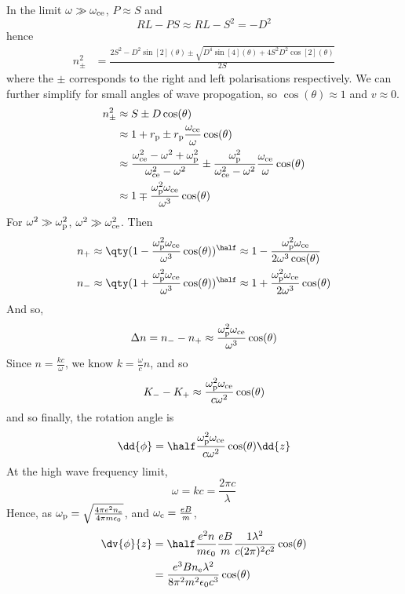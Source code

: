 \documentclass{book}         		                %
\begin{document}
In the limit $\omega \gg \omega_{\rm ce}$, $P \approx S$ and 
\[ RL - PS \approx  RL -S^2 = -D^2 \]
hence
\begin{align*}
  n_{\pm}^2 &= \frac{2 S^2 - D^2 \sin[2](\theta) \pm \sqrt{D^4 \sin[4](\theta) + 4 S^2 D^2 \cos[2](\theta)}}{2S}
\end{align*}
where the $\pm$ corresponds to the right and left polarisations
respectively. We can further simplify for small angles of wave
propogation, so $\cos(\theta)\approx 1$ and $v \approx 0$.
\begin{align*} n_{\pm}^2 &\approx S \pm D \cos(\theta) \\
& \approx 1 + r_{\rm p} \pm r_{\rm p} \frac{\omega_{\rm ce}}{\omega} \cos(\theta) \\
& \approx \frac{\omega_{\rm ce}^2 - \omega^2 + \omega_{\rm p}^2}{\omega_{\rm ce}^2 - \omega^2} \pm \frac{\omega_{\rm p}^2}{\omega_{\rm ce}^2 -\omega^2} \frac{\omega_{\rm ce}}{\omega} \cos(\theta) \\
& \approx 1  \mp \frac{\omega_{\rm p}^2 \omega_{\rm ce}}{\omega^3} \cos(\theta)
\end{align*}
For $\omega^2 \gg \omega_{\rm p}^2$, $\omega^2 \gg \omega_{\rm ce}^2$.
Then
\begin{align*}
  n_+ & \approx \qty( 1 - \frac{\omega_{\rm p}^2 \omega_{\rm ce}}{\omega^3} \cos(\theta))^{\half} \approx 1 - \frac{\omega_{\rm p}^2 \omega_{\rm ce}}{2 \omega^3 \cos(\theta)} \\
  n_- & \approx \qty( 1+ \frac{\omega_{\rm p}^2 \omega_{\rm ce}}{\omega^3} \cos(\theta) )^{\half} \approx 1 + \frac{\omega_{\rm p}^2 \omega_{\rm ce}}{2 \omega^3} \cos(\theta)
\end{align*}
And so,
\[ \Delta n = n_- - n_+ \approx \frac{\omega_{\rm p}^2 \omega_{\rm ce}}{\omega^3} \cos(\theta) \]
Since $n = \frac{kc}{\omega}$, we know $k = \frac{\omega}{c} n$, and so
\begin{align*}
  K_- - K_+ \approx \frac{\omega_{\rm p}^2 \omega_{\rm ce}}{c \omega^2} \cos(\theta) 
\end{align*}
and so finally, the rotation angle is
\begin{equation}
  \label{eq:13}
  \dd{\phi} = \half \frac{\omega_{\rm p}^2 \omega_{\rm ce}}{c \omega^2} \cos(\theta) \dd{z}
\end{equation}
At the high wave frequency limit,
\[ \omega = k c = \frac{2 \pi c}{\lambda} \] Hence, as $\omega_{\rm p}
= \sqrt{\frac{4 \pi e^2 n_{\rm e}}{4 \pi m \epsilon_0}}$, and
$\omega_{\rm c} = \frac{eB}{m}$,
\begin{align*}
  \dv{\phi}{z} &=  \half \frac{e^2 n }{m \epsilon_0} \frac{eB}{m} \frac{1 \lambda^2}{c (2 \pi)^2 c^2} \cos(\theta) \\
&= \frac{e^3 B n_{\rm e} \lambda^2}{8 \pi^2 m^2 \epsilon_0 c^3} \cos(\theta)
\end{align*}
\end{document}
